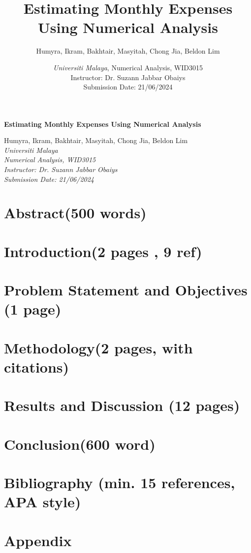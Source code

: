 \documentclass[a4paper,12pt]{article}
\title{\textbf{Estimating Monthly Expenses Using Numerical Analysis}}
\author{Humyra, Ikram, Bakhtair, Masyitah, Chong Jia, Beldon Lim}
\date{\textit{Universiti Malaya}, Numerical Analysis, WID3015 \\ Instructor: Dr. Suzann Jabbar Obaiys \\ Submission Date: 21/06/2024}
\begin{document}
\begin{titlepage}
    \centering
    \vspace*{\fill}
    \Huge
    \textbf{Estimating Monthly Expenses Using Numerical Analysis}
    \vspace{.2in}  
    \Large
    
    Humyra, Ikram, Bakhtair, Masyitah, Chong Jia, Beldon Lim \\[0.5em]
    \textit{Universiti Malaya} \\[0.2em]
    \textit{Numerical Analysis, WID3015} \\[0.2em]
    \textit{Instructor: Dr. Suzann Jabbar Obaiys} \\[0.2em]
    \textit{Submission Date: 21/06/2024}
    \vspace*{\fill}
\end{titlepage}

\newpage
\tableofcontents
\newpage 

\section{Abstract(500 words)}

\section{Introduction(2 pages , 9 ref)}

\section{Problem Statement and Objectives (1 page)}

\section{Methodology(2 pages, with citations)}

\section{Results and Discussion (12 pages)}

\section{Conclusion(600 word)}

\section{Bibliography (min. 15 references, APA style)}
\cite{SAKA201325}


\section{Appendix}

\end{document}
